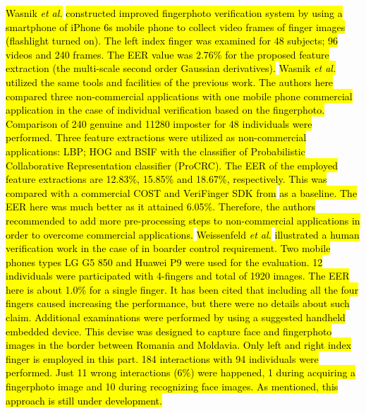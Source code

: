 \documentclass[review]{elsarticle}
\begin{document}
	\hl{Wasnik \textit{et al.}} \cite{Wasnik2018Improved} \hl{constructed improved fingerphoto verification system by using a smartphone of iPhone 6s mobile phone to collect video frames of finger images (flashlight turned on). The left index finger was examined for 48 subjects; 96 videos and 240 frames. The EER value was 2.76\% for the proposed feature extraction (the multi-scale	second order Gaussian derivatives).} \hl{Wasnik \textit{et al.}} \cite{wasnik2018baseline} \hl{utilized the same tools and facilities of the previous work. The authors here compared three non-commercial applications with one mobile phone commercial application in the case of individual verification based on the fingerphoto. Comparison of 240 genuine and 11280 imposter for 48 individuals were performed. Three feature extractions were utilized as non-commercial applications: LBP; HOG and BSIF with the classifier of Probabilistic Collaborative Representation classifier (ProCRC). The EER of the employed feature extractions are 12.83\%, 15.85\% and 18.67\%, respectively. This was compared with a commercial COST and VeriFinger SDK from} \cite{NEURO_technology} \hl{as a baseline. The EER here was much better as it attained 6.05\%. Therefore, the authors recommended to add more pre-processing steps to non-commercial applications in order to overcome commercial applications.} \hl{Weissenfeld \textit{et al.}} \cite{Weissenfeld2018contactless} \hl{illustrated a human verification work in the case of in boarder control requirement. Two mobile phones types LG G5 850 and Huawei P9 were used for the evaluation. 12 individuals were participated with 4-fingers and total of 1920 images. The EER here is about 1.0\% for a single finger. It has been cited that including all the four fingers caused increasing the performance, but there were no details about such claim. Additional examinations were performed by using a suggested handheld embedded device. This devise was designed to capture face and fingerphoto images in the border between Romania and Moldavia. Only left and right index finger is employed in this part. 184 interactions with 94 individuals were performed. Just 11 wrong interactions (6\%) were happened, 1 during acquiring a fingerphoto image and 10 during recognizing face images. As mentioned, this approach is still under development.}
\end{document}
